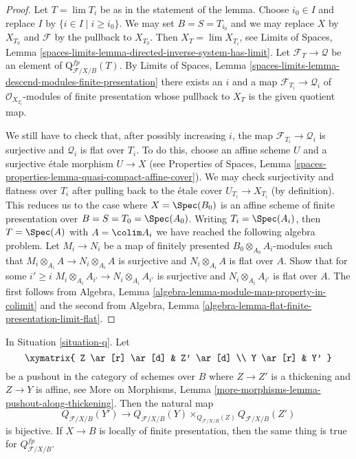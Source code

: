 \begin{proof}
Let $T = \lim T_i$ be as in the statement of the lemma.
Choose $i_0 \in I$ and replace $I$ by $\{i \in I \mid i \geq i_0\}$.
We may set $B = S = T_{i_0}$ and we may replace $X$ by $X_{T_0}$
and $\mathcal{F}$ by the pullback to $X_{T_0}$. Then
$X_T = \lim X_{T_i}$, see
Limits of Spaces, Lemma
\ref{spaces-limits-lemma-directed-inverse-system-has-limit}.
Let $\mathcal{F}_T \to \mathcal{Q}$ be an element of
$\text{Q}^{fp}_{\mathcal{F}/X/B}(T)$. By
Limits of Spaces, Lemma
\ref{spaces-limits-lemma-descend-modules-finite-presentation}
there exists an $i$ and a map $\mathcal{F}_{T_i} \to \mathcal{Q}_i$
of $\mathcal{O}_{X_{T_i}}$-modules of finite presentation whose
pullback to $X_T$ is the given quotient map.

\medskip\noindent
We still have to check that, after possibly increasing $i$, the map
$\mathcal{F}_{T_i} \to \mathcal{Q}_i$ is surjective and $\mathcal{Q}_i$
is flat over $T_i$. To do this, choose an affine scheme $U$ and a
surjective \'etale morphism $U \to X$ (see Properties of Spaces,
Lemma \ref{spaces-properties-lemma-quasi-compact-affine-cover}).
We may check surjectivity and flatness over $T_i$ after pulling
back to the \'etale cover $U_{T_i} \to X_{T_i}$ (by definition).
This reduces us to the case where $X = \Spec(B_0)$ is an affine scheme of
finite presentation over $B = S = T_0 = \Spec(A_0)$.
Writing $T_i = \Spec(A_i)$, then $T = \Spec(A)$ with $A = \colim A_i$
we have reached the following algebra problem. Let $M_i \to N_i$
be a map of finitely presented $B_0 \otimes_{A_0} A_i$-modules
such that $M_i \otimes_{A_i} A \to N_i \otimes_{A_i} A$ is surjective
and $N_i \otimes_{A_i} A$ is flat over $A$. Show that for some $i' \geq i$
$M_i \otimes_{A_i} A_{i'} \to N_i \otimes_{A_i} A_{i'}$ is surjective
and $N_i \otimes_{A_i} A_{i'}$ is flat over $A$.
The first follows from
Algebra, Lemma \ref{algebra-lemma-module-map-property-in-colimit}
and the second from
Algebra, Lemma \ref{algebra-lemma-flat-finite-presentation-limit-flat}.
\end{proof}

\begin{lemma}
\label{lemma-q-RS-star}
In Situation \ref{situation-q}. Let
$$
\xymatrix{
Z \ar[r] \ar[d] & Z' \ar[d] \\
Y \ar[r] & Y'
}
$$
be a pushout in the category of schemes over $B$ where
$Z \to Z'$ is a thickening and $Z \to Y$ is affine, see
More on Morphisms, Lemma \ref{more-morphisms-lemma-pushout-along-thickening}.
Then the natural map
$$
Q_{\mathcal{F}/X/B}(Y') \longrightarrow
Q_{\mathcal{F}/X/B}(Y) \times_{Q_{\mathcal{F}/X/B}(Z)} Q_{\mathcal{F}/X/B}(Z')
$$
is bijective. If $X \to B$ is locally of finite presentation, then
the same thing is true for $Q^{fp}_{\mathcal{F}/X/B}$.
\end{lemma}

